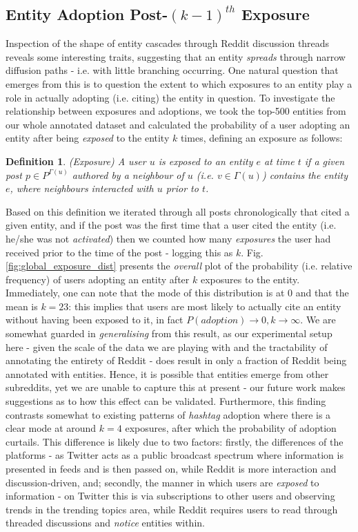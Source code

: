 \documentclass[10pt,journal,compsoc]{IEEEtran}
\newtheorem{mydef}{Definition}
\begin{document}
\subsection{Entity Adoption Post-$({k-1})^{th}$ Exposure}
Inspection of the shape of entity cascades through Reddit discussion threads reveals some interesting traits, suggesting that an entity \emph{spreads} through narrow diffusion paths - i.e. with little branching occurring.
One natural question that emerges from this is to question the extent to which exposures to an entity play a role in actually adopting (i.e. citing) the entity in question.
To investigate the relationship between exposures and adoptions, we took the top-500 entities from our whole annotated dataset and calculated the probability of a user adopting an entity after being \emph{exposed} to the entity $k$ times, defining an exposure as follows:

\begin{mydef}
\label{def:exposure}
(Exposure) A user $u$ is exposed to an entity $e$ at time $t$ if a given post $p \in P^{\Gamma(u)}$ authored by a neighbour of $u$ (i.e. $v \in \Gamma(u)$) contains the entity $e$, where neighbours interacted with $u$ prior to $t$.
\end{mydef}

Based on this definition we iterated through all posts chronologically that cited a given entity, and if the post was the first time that a user cited the entity (i.e. he/she was not \emph{activated}) then we counted how many \emph{exposures} the user had received prior to the time of the post - logging this as $k$.
Fig. \ref{fig:global_exposure_dist} presents the \emph{overall} plot of the probability (i.e. relative frequency) of users adopting an entity after $k$ exposures to the entity.
Immediately, one can note that the mode of this distribution is at $0$ and that the mean is $k=23$: this implies that users are most likely to actually cite an entity without having been exposed to it, in fact $P(adoption) \rightarrow 0, k \rightarrow \infty$.
We are somewhat guarded in \emph{generalising} from this result, as our experimental setup here - given the scale of the data we are playing with and the tractability of annotating the entirety of Reddit - does result in only a fraction of Reddit being annotated with entities.
Hence, it is possible that entities emerge from other subreddits, yet we are unable to capture this at present - our future work makes suggestions as to how this effect can be validated.
Furthermore, this finding contrasts somewhat to existing patterns of \emph{hashtag} adoption \cite{romero2011differences} where there is a clear mode at around $k=4$ exposures, after which the probability of adoption curtails.
This difference is likely due to two factors: firstly, the differences of the platforms - as Twitter acts as a public broadcast spectrum where information is presented in feeds and is then passed on, while Reddit is more interaction and discussion-driven, and; secondly, the manner in which users are \emph{exposed} to information - on Twitter this is via subscriptions to other users and observing trends in the trending topics area, while Reddit requires users to read through threaded discussions and \emph{notice} entities within.
\end{document}
